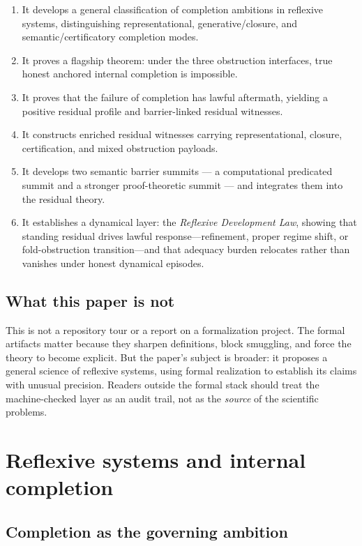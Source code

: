 \documentclass[11pt]{article}
\theoremstyle{plain}
\theoremstyle{definition}
\theoremstyle{remark}
\begin{document}
\begin{enumerate}[leftmargin=2em]
\item It develops a general classification of completion ambitions in reflexive systems, distinguishing representational, generative/closure, and semantic/certificatory completion modes.
\item It proves a flagship theorem: under the three obstruction interfaces, true honest anchored internal completion is impossible.
\item It proves that the failure of completion has lawful aftermath, yielding a positive residual profile and barrier-linked residual witnesses.
\item It constructs enriched residual witnesses carrying representational, closure, certification, and mixed obstruction payloads.
\item It develops two semantic barrier summits --- a computational predicated summit and a stronger proof-theoretic summit --- and integrates them into the residual theory.
\item It establishes a dynamical layer: the \emph{Reflexive Development Law}, showing that standing residual drives lawful response---refinement, proper regime shift, or fold-obstruction transition---and that adequacy burden relocates rather than vanishes under honest dynamical episodes.
\end{enumerate}

\subsection{What this paper is not}

This is not a repository tour or a report on a formalization project. The formal artifacts matter because they sharpen definitions, block smuggling, and force the theory to become explicit. But the paper's subject is broader: it proposes a general science of reflexive systems, using formal realization to establish its claims with unusual precision. Readers outside the formal stack should treat the machine-checked layer as an audit trail, not as the \emph{source} of the scientific problems.

\section{Reflexive systems and internal completion}

\subsection{Completion as the governing ambition}
\end{document}
